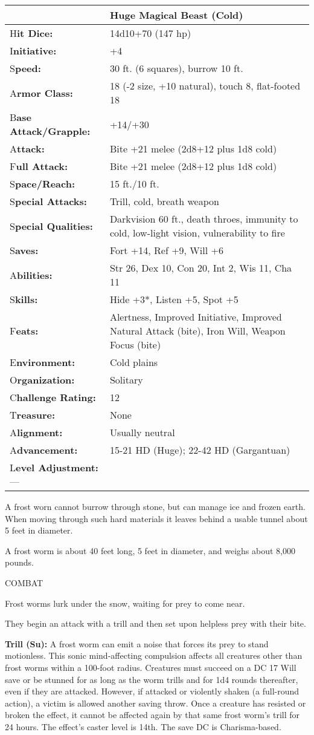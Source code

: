 \documentclass{article}
\begin{document}
\begin{tabular}{|>{\raggedright}p{91pt}|>{\raggedright}p{204pt}|}
\hline
  & Huge Magical Beast (Cold)\tabularnewline
\hline
H\textbf{it Dice:} & 14d10+70 (147 hp)\tabularnewline
\hline
I\textbf{nitiative:} & +4\tabularnewline
\hline
S\textbf{peed:} & 30 ft. (6 squares), burrow 10 ft.\tabularnewline
\hline
A\textbf{rmor Class:} & 18 (-2 size, +10 natural), touch 8, flat-footed 18\tabularnewline
\hline
B\textbf{ase Attack/Grapple:} & +14/+30\tabularnewline
\hline
A\textbf{ttack:} & Bite +21 melee (2d8+12 plus 1d8 cold)\tabularnewline
\hline
F\textbf{ull Attack:} & Bite +21 melee (2d8+12 plus 1d8 cold)\tabularnewline
\hline
S\textbf{pace/Reach:} & 15 ft./10 ft.\tabularnewline
\hline
S\textbf{pecial Attacks:} & Trill, cold, breath weapon\tabularnewline
\hline
S\textbf{pecial Qualities:} & Darkvision 60 ft., death throes, immunity to cold, 
low-light vision, vulnerability to fire\tabularnewline
\hline
S\textbf{aves:} & Fort +14, Ref +9, Will +6\tabularnewline
\hline
A\textbf{bilities:} & Str 26, Dex 10, Con 20, Int 2, Wis 11, Cha 11\tabularnewline
\hline
S\textbf{kills:} & Hide +3*, Listen +5, Spot +5\tabularnewline
\hline
F\textbf{eats:} & Alertness, Improved Initiative, Improved Natural Attack (bite), 
Iron Will, Weapon Focus (bite)\tabularnewline
\hline
E\textbf{nvironment:} & Cold plains\tabularnewline
\hline
O\textbf{rganization:} & Solitary\tabularnewline
\hline
C\textbf{hallenge Rating:} & 12\tabularnewline
\hline
T\textbf{reasure:} & None\tabularnewline
\hline
A\textbf{lignment:} & Usually neutral\tabularnewline
\hline
A\textbf{dvancement:} & 15-21 HD (Huge); 22-42 HD (Gargantuan)\tabularnewline
\hline
L\textbf{evel Adjustment:}--- & \tabularnewline
\hline
\end{tabular}

A frost worn cannot burrow through stone, but can manage ice and frozen earth. 
When moving through such hard materials it leaves behind a usable tunnel about 
5 feet in diameter.

A frost worm is about 40 feet long, 5 feet in diameter, and weighs about 8,000 
pounds.

COMBAT

Frost worms lurk under the snow, waiting for prey to come near.

They begin an attack with a trill and then set upon helpless prey with their bite.

\textbf{Trill (Su): }A frost worm can emit a noise that forces its prey to stand 
motionless. This sonic mind-affecting compulsion affects all creatures other than 
frost worms within a 100-foot radius. Creatures must succeed on a DC 17 Will save 
or be stunned for as long as the worm trills and for 1d4 rounds thereafter, even 
if they are attacked. However, if attacked or violently shaken (a full-round action), 
a victim is allowed another saving throw. Once a creature has resisted or broken 
the effect, it cannot be affected again by that same frost worm's trill for 24 
hours. The effect's caster level is 14th. The save DC is Charisma-based.
\end{document}
